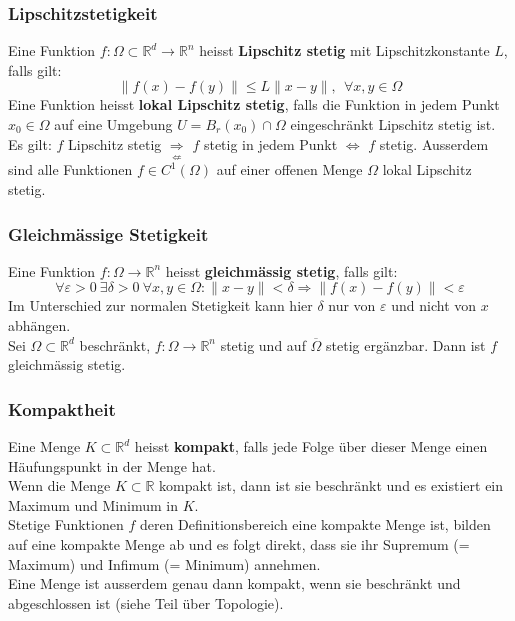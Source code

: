 \documentclass[a4paper,10pt]{scrartcl}
\begin{document}
\subsubsection{Lipschitzstetigkeit}
Eine Funktion $f:\Omega \subset \mathbb{R}^d \to \mathbb{R}^n$ heisst \textbf{Lipschitz stetig} mit Lipschitzkonstante $L$, falls gilt: 
\begin{equation}
	\|f(x)-f(y)\|\leq L \|x-y\|, \ \ \forall x,y\in \Omega
\end{equation}
Eine Funktion heisst \textbf{lokal Lipschitz stetig}, falls die Funktion in jedem Punkt $x_0\in\Omega$ auf eine Umgebung $U = B_r(x_0) \cap \Omega$ eingeschränkt Lipschitz stetig ist.\\
Es gilt: $f$ Lipschitz stetig $\underset{\nLeftarrow}{\Longrightarrow}$  $f$ stetig in jedem Punkt $\Longleftrightarrow$ $f$ stetig. Ausserdem sind alle Funktionen $f\in C^1(\Omega)$ auf einer offenen Menge $\Omega$ lokal Lipschitz stetig. 
\subsubsection{Gleichmässige Stetigkeit}
Eine Funktion $f:\Omega \to \mathbb{R}^n$ heisst \textbf{gleichmässig stetig}, falls gilt: 
\begin{equation}
	\forall \varepsilon >0 \ \exists \delta >0 \ \forall x,y\in\Omega: \|x-y\|<\delta \Rightarrow \|f(x)-f(y)\|<\varepsilon
\end{equation}
Im Unterschied zur normalen Stetigkeit kann hier $\delta$ nur von $\varepsilon$ und nicht von $x$ abhängen.\\
Sei $\Omega\subset \mathbb{R}^d$ beschränkt, $f:\Omega \to \mathbb{R}^n$ stetig und auf $\overline{\Omega}$ stetig ergänzbar. Dann ist $f$ gleichmässig stetig.

\subsubsection{Kompaktheit}
Eine Menge $K\subset \mathbb{R}^d$ heisst \textbf{kompakt}, falls jede Folge über dieser Menge einen Häufungspunkt in der Menge hat. \\
Wenn die Menge $K\subset \mathbb{R}$ kompakt ist, dann ist sie beschränkt und es existiert ein Maximum und Minimum in $K$. \\
Stetige Funktionen $f$ deren Definitionsbereich eine kompakte Menge ist, bilden auf eine kompakte Menge ab und es folgt direkt, dass sie ihr Supremum (= Maximum) und Infimum (= Minimum) annehmen. \\
Eine Menge ist ausserdem genau dann kompakt, wenn sie beschränkt und abgeschlossen ist (siehe Teil über Topologie).
\end{document}
